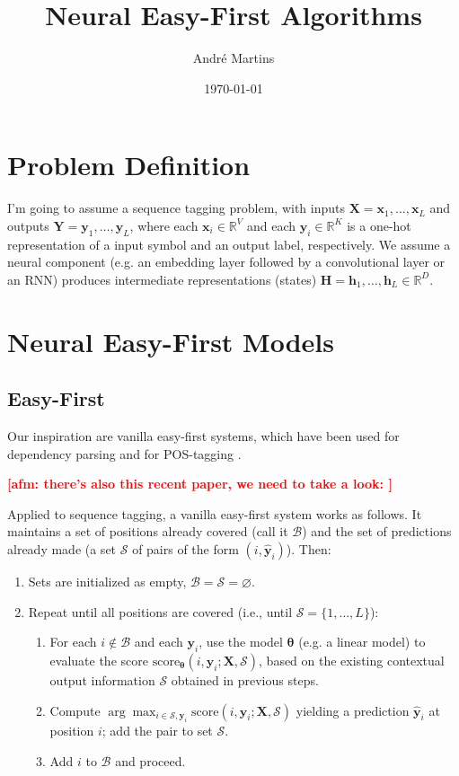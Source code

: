 \documentclass[10pt,a4paper]{article}
\newcommand{\set}[1]{\mathbb{#1}}
\newcommand{\sett}[1]{\mathcal{#1}}
\newcommand{\matr}[1]{\mathbf{#1}}
\newcommand{\vectsymb}[1]{\boldsymbol{#1}}
\newcommand{\x}{{\vectsymb{x}}}
\newcommand{\y}{{\vectsymb{y}}}
\newcommand{\hh}{{\vectsymb{h}}}
\newcommand{\X}{{\matr{X}}}
\newcommand{\Y}{{\matr{Y}}}
\newcommand{\HH}{{\matr{H}}}
\newcommand{\andre}[1]{{\textcolor{red}{\bf [{\sc afm:} #1]}}}
\begin{document}
\author{Andr\'e Martins}
\title{Neural Easy-First Algorithms}
\date{\today}
\maketitle

\section{Problem Definition}

I'm going to assume a sequence tagging problem, with inputs $\X = \x_1, \ldots, \x_L$ 
and outputs $\Y = \y_1, \ldots, \y_L$, where each $\x_i \in \set{R}^V$ and each $\y_i \in \set{R}^K$ is a one-hot representation of a input symbol and an output label, respectively. 
We assume a neural component (e.g. an embedding layer followed by a convolutional layer or an RNN) 
produces intermediate representations (states) 
$\HH = \hh_1, \ldots, \hh_L \in \set{R}^D$. 

\section{Neural Easy-First Models}

\subsection{Easy-First}

Our inspiration are vanilla easy-first systems, which have been used for dependency parsing \citep{Goldberg2010} and for POS-tagging \citep{Ma2012,Ma2013}.

\andre{there's also this recent paper, we need to take a look: \citet{Kiperwasser2016}}

Applied to sequence tagging, a vanilla easy-first system works as follows. It maintains a set of positions already covered (call it $\sett{B}$) and the set of 
predictions already made (a set $\sett{S}$ of pairs of the form $(i,\widehat{\y}_i)$). 
Then:
\begin{enumerate}
\item Sets are initialized as empty, $\sett{B} = \sett{S} = \varnothing$. 
\item Repeat until all positions are covered (i.e., until $\sett{S} = \{1,\ldots,L\}$):
\begin{enumerate}
\item For each $i \notin \sett{B}$ and each $\y_i$, use the model $\vectsymb{\theta}$ (e.g. a linear model) to 
evaluate the score $\mathrm{score}_{\vectsymb{\theta}}(i,\y_i; \X, \sett{S})$, 
based on the existing contextual output information $\sett{S}$ obtained in previous steps.
\item Compute $\arg\max_{i\in \sett{S},\y_i} \mathrm{score}(i,\y_i; \X, \sett{S})$ 
yielding a prediction $\widehat{\y}_i$ at position $i$; add the pair to set $\sett{S}$.
\item Add $i$ to $\sett{B}$ and proceed. 
\end{enumerate}
\end{enumerate}
\end{document}
